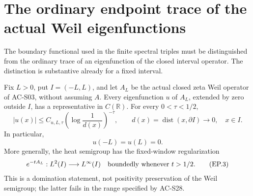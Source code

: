 \section{The ordinary endpoint trace of the actual Weil eigenfunctions}
\label{sec:spectral-endpoint}

The boundary functional used in the finite spectral triples must
be distinguished from the ordinary trace of an eigenfunction of
the closed interval operator.  The distinction is substantive
already for a fixed interval.

\begin{theorem}
\label{AC-S36}
Fix \(L>0\), put \(I=(-L,L)\), and let \(A_L\) be the actual
closed zeta Weil operator of AC-S03, without assuming \(A\).
Every eigenfunction \(u\) of \(A_L\), extended by zero outside
\(I\), has a representative in \(C(\mathbb R)\).  For every
\(0<\tau<1/2\),
\[
 |u(x)|\leq C_{u,L,\tau}
          \left(\log\frac1{d(x)}\right)^{-\tau},
 \qquad d(x)=\operatorname{dist}(x,\partial I)\longrightarrow0,
 \quad x\in I.                                      \tag{EP.1}
\]
In particular,
\[
                         u(-L)=u(L)=0.              \tag{EP.2}
\]
More generally, the heat semigroup has the fixed-window
regularization
\[
              e^{-tA_L}:L^2(I)\longrightarrow L^\infty(I)
              \quad\hbox{boundedly whenever }t>1/2. \tag{EP.3}
\]
This is a domination statement, not positivity preservation
of the Weil semigroup; the latter fails in the range specified
by AC-S28.
\end{theorem}
